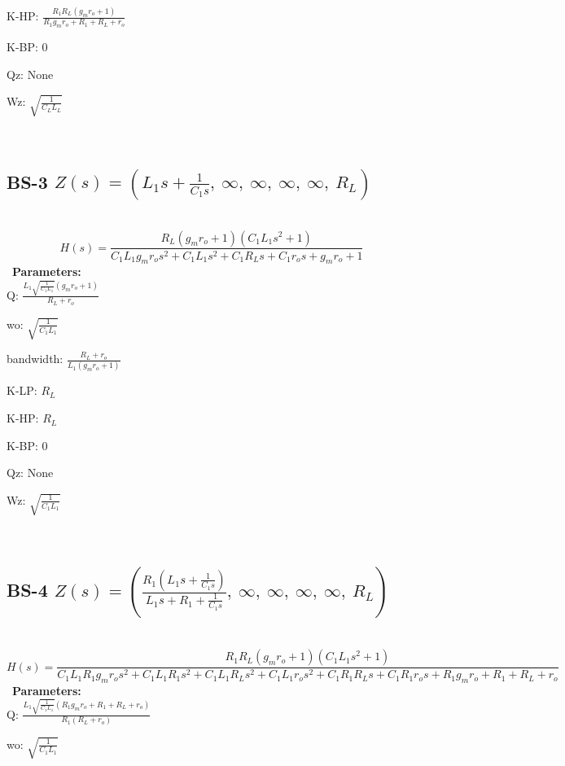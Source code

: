 \documentclass{article}
\begin{document}
K-HP: $\frac{R_{1} R_{L} \left(g_{m} r_{o} + 1\right)}{R_{1} g_{m} r_{o} + R_{1} + R_{L} + r_{o}}$\ 

K-BP: $0$\ 

Qz: $\text{None}$\ 

Wz: $\sqrt{\frac{1}{C_{L} L_{L}}}$\ 

\ 

\subsection{BS-3 $Z(s) = \left( L_{1} s + \frac{1}{C_{1} s}, \  \infty, \  \infty, \  \infty, \  \infty, \  R_{L}\right)$ } \ 
\textbf{\[H(s) = \frac{R_{L} \left(g_{m} r_{o} + 1\right) \left(C_{1} L_{1} s^{2} + 1\right)}{C_{1} L_{1} g_{m} r_{o} s^{2} + C_{1} L_{1} s^{2} + C_{1} R_{L} s + C_{1} r_{o} s + g_{m} r_{o} + 1}\] } \ 
\textbf{Parameters:}\\ 

Q: $\frac{L_{1} \sqrt{\frac{1}{C_{1} L_{1}}} \left(g_{m} r_{o} + 1\right)}{R_{L} + r_{o}}$\ 

wo: $\sqrt{\frac{1}{C_{1} L_{1}}}$\ 

bandwidth: $\frac{R_{L} + r_{o}}{L_{1} \left(g_{m} r_{o} + 1\right)}$\ 

K-LP: $R_{L}$\ 

K-HP: $R_{L}$\ 

K-BP: $0$\ 

Qz: $\text{None}$\ 

Wz: $\sqrt{\frac{1}{C_{1} L_{1}}}$\ 

\ 

\subsection{BS-4 $Z(s) = \left( \frac{R_{1} \left(L_{1} s + \frac{1}{C_{1} s}\right)}{L_{1} s + R_{1} + \frac{1}{C_{1} s}}, \  \infty, \  \infty, \  \infty, \  \infty, \  R_{L}\right)$ } \ 
\textbf{\[H(s) = \frac{R_{1} R_{L} \left(g_{m} r_{o} + 1\right) \left(C_{1} L_{1} s^{2} + 1\right)}{C_{1} L_{1} R_{1} g_{m} r_{o} s^{2} + C_{1} L_{1} R_{1} s^{2} + C_{1} L_{1} R_{L} s^{2} + C_{1} L_{1} r_{o} s^{2} + C_{1} R_{1} R_{L} s + C_{1} R_{1} r_{o} s + R_{1} g_{m} r_{o} + R_{1} + R_{L} + r_{o}}\] } \ 
\textbf{Parameters:}\\ 

Q: $\frac{L_{1} \sqrt{\frac{1}{C_{1} L_{1}}} \left(R_{1} g_{m} r_{o} + R_{1} + R_{L} + r_{o}\right)}{R_{1} \left(R_{L} + r_{o}\right)}$\ 

wo: $\sqrt{\frac{1}{C_{1} L_{1}}}$\ 
\end{document}
